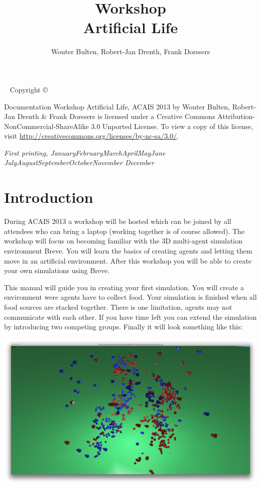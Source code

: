 \documentclass[a4paper]{tufte-book}
\title[Workshop Artificial Life]{Workshop\\ Artificial Life}
\author[Wouter Bulten, Robert-Jan Drenth, Frank Dorssers]{Wouter Bulten, Robert-Jan Drenth, Frank Dorssers}
\newcommand{\monthyear}{%
  \ifcase\month\or January\or February\or March\or April\or May\or June\or
  July\or August\or September\or October\or November\or
  December\fi\space\number\year
}
\begin{document}
\maketitle


\newpage
\begin{fullwidth}
~\vfill
\thispagestyle{empty}
\setlength{\parindent}{0pt}
\setlength{\parskip}{\baselineskip}
Copyright \copyright\ \the\year\ \thanklessauthor

\par{}


\par Documentation Workshop Artificial Life, ACAIS 2013 by Wouter Bulten, Robert-Jan Drenth \& Frank Dorssers is licensed under a Creative Commons Attribution-NonCommercial-ShareAlike 3.0 Unported License. To view a copy of this license, visit \url{http://creativecommons.org/licenses/by-nc-sa/3.0/}.

\par\textit{First printing, \monthyear}
\end{fullwidth}

\tableofcontents
\setlength\parindent{0pt}
\chapter*{Introduction}

During ACAIS 2013 a workshop will be hosted which can be joined by all attendees who can bring a laptop (working together is of course allowed). The workshop will focus on becoming familiar with the 3D multi-agent simulation environment Breve. You will learn the basics of creating agents and letting them move in an artificial environment. After this workshop you will be able to create your own simulations using Breve.

This manual will guide you in creating your first simulation. You will create a environment were agents have to collect food. Your simulation is finished when all food sources are stacked together. There is one limitation, agents may not communicate with each other. If you have time left you can extend the simulation by introducing two competing groups. Finally it will look something like this:

\includegraphics{endproduct}
\end{document}
